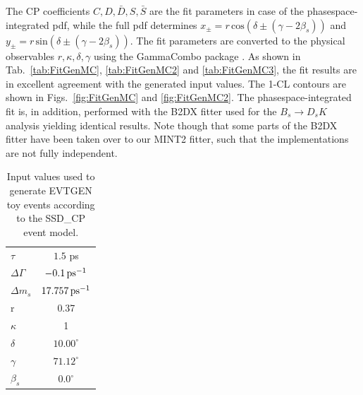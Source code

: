 The CP coefficients $C,D,\bar D,S,\bar S$ are the fit parameters in case of the phasespace-integrated pdf,
while the full pdf determines $x_\pm = r \, \text{cos}(\delta\pm(\gamma-2\beta_s))$ and $y_\pm = r \, \text{sin}(\delta\pm(\gamma-2\beta_s))$.
The fit parameters are converted to the physical observables $r,\kappa,\delta,\gamma$ using the \textsf{GammaCombo} package \cite{GammaCombo}.
As shown in Tab.~\ref{tab:FitGenMC}, \ref{tab:FitGenMC2} and \ref{tab:FitGenMC3}, the fit results are in excellent agreement with the generated input values.
The 1-CL contours are shown in Figs.~\ref{fig:FitGenMC} and \ref{fig:FitGenMC2}.
The phasespace-integrated fit is, in addition, performed with the \textsf{B2DX} fitter used for the $B_s \to D_s K$ analysis yielding identical results.
Note though that some parts of the \textsf{B2DX} fitter have been taken over to our \textsf{MINT2} fitter, such that the implementations are not fully independent.

\begin{table}[h]
\caption{Input values used to generate \textsf{EVTGEN} toy events according to the \textsf{SSD\_CP} event model.} 		
  \centering
  \begin{tabular}
    {l c}
    \hline \hline
    $\tau$  & $1.5$ ps \\   
    $\Delta\Gamma$  & $-0.1 {\mathrm{ \,ps}}^{-1}$ \\   
     $\Delta m_s$  & $17.757 {\mathrm{ \,ps}}^{-1}$ \\   
     r & 0.37\\
     $\kappa$ & 1\\
     $\delta$ & $10.00^\circ$\\
     $\gamma$ & $71.12^\circ$\\
     $\beta_s$ & $0.0^\circ$\\
    \hline \hline
  \end{tabular}
  \label{tab:InputGenMC}
\end{table}

